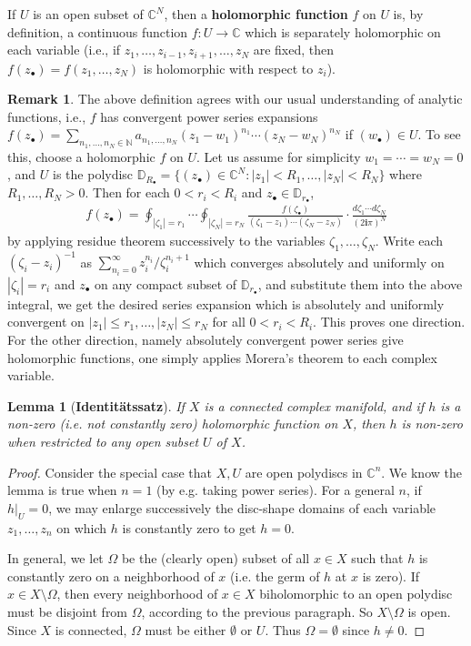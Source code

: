 \documentclass[12pt,b5paper,notitlepage]{report}
\theoremstyle{definition}
\newtheorem{rem}[df]{Remark}
\theoremstyle{plain}
\newtheorem{lm}[df]{Lemma}
\newcommand{\im}{\mathbf{i}}
\newcommand{\blt}{\bullet}
\newcommand{\Cbb}{\mathbb C}
\newcommand{\Nbb}{\mathbb N}
\newcommand{\Dbb}{\mathbb D}
\numberwithin{equation}{section}
\begin{document}
If $U$ is an open subset of $\Cbb^N$, then a \textbf{holomorphic function} $f$ on $U$ is, by definition, a continuous function $f:U\rightarrow\Cbb$ which is separately holomorphic on each variable (i.e., if $z_1,\dots,z_{i-1},z_{i+1},\dots,z_N$ are fixed, then $f(z_\blt)=f(z_1,\dots,z_N)$ is holomorphic with respect to $z_i$).

\begin{rem}
The above definition agrees with our usual understanding of analytic functions, i.e., $f$ has convergent power series expansions $f(z_\blt)=\sum_{n_1,\dots,n_N\in\Nbb}a_{n_1,\dots,n_N}(z_1-w_1)^{n_1}\cdots (z_N-w_N)^{n_N}$ if $(w_\blt)\in U$. To see this, choose a holomorphic $f$ on $U$. Let us assume for simplicity $w_1=\cdots=w_N=0$, and $U$ is the polydisc $\Dbb_{R_\blt}=\{(z_\blt)\in\Cbb^N:|z_1|<R_1,\dots,|z_N|<R_N\}$ where $R_1,\dots,R_N>0$. Then for each $0<r_i<R_i$ and $z_\blt\in\Dbb_{r_\blt}$,
\begin{align*}
f(z_\blt)=\oint_{|\zeta_1|=r_1}\cdots\oint_{|\zeta_N|=r_N}\frac{f(\zeta_\blt)}{(\zeta_1-z_1)\cdots(\zeta_N-z_N)}\cdot \frac{d\zeta_1\cdots d\zeta_N}{(2\im\pi)^N}
\end{align*}
by applying residue theorem successively to the variables $\zeta_1,\dots,\zeta_N$. Write each $(\zeta_i-z_i)^{-1}$ as $\sum_{n_i=0}^\infty z_i^{n_i}/\zeta_i^{n_i+1}$ which converges absolutely and uniformly on $|\zeta_i|=r_i$ and $z_\blt$ on any compact subset of $\Dbb_{r_\blt}$, and substitute them into the above integral, we get the desired series expansion which is absolutely and uniformly convergent on $|z_1|\leq r_1,\dots,|z_N|\leq r_N$ for all $0<r_i<R_i$. This proves one direction. For the other direction, namely absolutely convergent power series give holomorphic functions, one simply applies Morera's theorem to each complex variable.
\end{rem}


\begin{lm}[\textbf{Identit\"atssatz}]\label{lb68}
If $X$ is a connected complex manifold, and if $h$ is a non-zero (i.e. not constantly zero) holomorphic function on $X$, then $h$ is non-zero when restricted to any open subset $U$ of $X$.
\end{lm}

\begin{proof}
Consider the special case that $X,U$ are open polydiscs in $\Cbb^n$. We know the lemma is true when $n=1$ (by e.g. taking power series). For a general $n$, if $h|_U=0$, we may enlarge successively the disc-shape domains of each variable $z_1,\dots,z_n$ on which $h$ is constantly zero to get $h=0$.

In general, we let $\Omega$ be the (clearly open) subset of all $x\in X$ such that $h$ is constantly zero on a neighborhood of $x$ (i.e. the germ of $h$ at $x$ is zero). If $x\in X\setminus\Omega$, then every neighborhood of $x\in X$ biholomorphic to an open polydisc must be disjoint from $\Omega$, according to the previous paragraph. So $X\setminus\Omega$ is open. Since $X$ is connected, $\Omega$ must be either $\emptyset$ or $U$. Thus $\Omega=\emptyset$ since $h\neq0$.
\end{proof}
\end{document}
